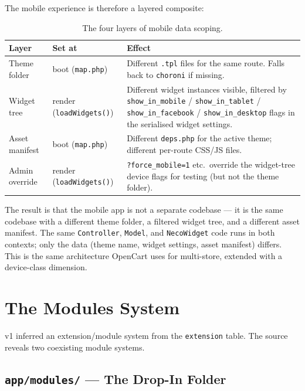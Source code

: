 \documentclass[11pt,a4paper]{article}
\begin{document}
The mobile experience is therefore a layered composite:

\begin{table}[htbp]
\centering
\caption{The four layers of mobile data scoping.}\label{tab:mobile-layers-v2}
\footnotesize\sloppy
\begin{tabularx}{\columnwidth}{>{\raggedright\arraybackslash}p{2.6cm}lX}
\toprule
\textbf{Layer} & \textbf{Set at} & \textbf{Effect} \\
\midrule
Theme folder & boot (\texttt{map.php}) & Different \texttt{.tpl} files for the same route. Falls back to \texttt{choroni} if missing. \\
Widget tree & render (\texttt{loadWidgets()}) & Different widget instances visible, filtered by \texttt{show\_in\_mobile} / \texttt{show\_in\_tablet} / \texttt{show\_in\_facebook} / \texttt{show\_in\_desktop} flags in the serialised widget settings. \\
Asset manifest & boot (\texttt{map.php}) & Different \texttt{deps.php} for the active theme; different per-route CSS/JS files. \\
Admin override & render (\texttt{loadWidgets()}) & \texttt{?force\_mobile=1} etc.\ override the widget-tree device flags for testing (but not the theme folder). \\
\bottomrule
\end{tabularx}
\end{table}

The result is that the mobile app is not a separate codebase ---
it is the same codebase with a different theme folder, a filtered
widget tree, and a different asset manifest. The same
\texttt{Controller}, \texttt{Model}, and \texttt{NecoWidget} code
runs in both contexts; only the data (theme name, widget
settings, asset manifest) differs. This is the same architecture
OpenCart uses for multi-store, extended with a device-class
dimension.

\section{The Modules System}\label{sec:modules}

v1 inferred an extension/module system from the \texttt{extension}
table. The source reveals two coexisting module systems.

\subsection{\texttt{app/modules/} --- The Drop-In Folder}
\end{document}
